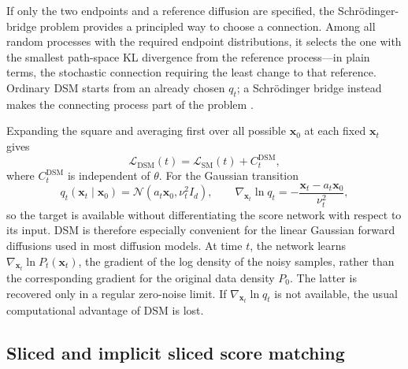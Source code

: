 \documentclass[11pt]{article}
\newcommand{\vct}[1]{\bm{#1}}
\begin{document}
\begin{mdframed}[
    linewidth=0.6pt,
    innerleftmargin=6pt,
    innerrightmargin=6pt,
    innertopmargin=6pt,
    innerbottommargin=6pt
]
If only the two endpoints and a reference diffusion are specified, the
Schrödinger-bridge problem provides a principled way to choose a connection.
Among all random processes with the required endpoint distributions, it selects
the one with the smallest path-space KL divergence from the reference process---in
plain terms, the stochastic connection requiring the least change to that
reference. Ordinary DSM starts from an already chosen \(q_t\); a
Schrödinger bridge instead makes the connecting process part of the problem
\cite{debortoli2021}.
\end{mdframed}

Expanding the square and averaging first over all possible
\(\vct{x}_0\) at each fixed \(\vct{x}_t\) gives
\begin{equation}
    \mathcal{L}_{\mathrm{DSM}}(t)
    =\mathcal{L}_{\mathrm{SM}}(t)+C_t^{\mathrm{DSM}},
    \label{eq:dsm-sm-equivalence}
\end{equation}
where \(C_t^{\mathrm{DSM}}\) is independent of \(\theta\). For the Gaussian
transition
\begin{equation}
    q_t(\vct{x}_t\mid\vct{x}_0)
    =\mathcal{N}(a_t\vct{x}_0,\nu_t^2 I_d),
    \qquad
    \nabla_{\vct{x}_t}\ln q_t
    =-\frac{\vct{x}_t-a_t\vct{x}_0}{\nu_t^2},
    \label{eq:gaussian-conditional-score}
\end{equation}
so the target is available without differentiating the score network with
respect to its input. DSM is therefore especially convenient for the linear
Gaussian forward diffusions used in most diffusion models. At time \(t\), the
network learns \(\nabla_{\vct{x}_t}\ln P_t(\vct{x}_t)\), the gradient of the
log density of the noisy samples, rather than the corresponding gradient for
the original data density \(P_0\). The latter is recovered only in a regular
zero-noise limit. If \(\nabla_{\vct{x}_t}\ln q_t\) is not available, the usual
computational advantage of DSM is lost.

\subsection{Sliced and implicit sliced score matching}
\end{document}
